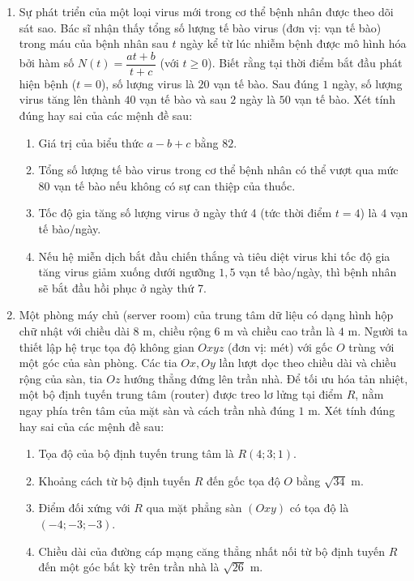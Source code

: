 \documentclass[12pt]{article}
\begin{document}
	\begin{enumerate}[label=\textbf{Câu \arabic*.}, leftmargin=*]
		
		\item Sự phát triển của một loại virus mới trong cơ thể bệnh nhân được theo dõi sát sao. Bác sĩ nhận thấy tổng số lượng tế bào virus (đơn vị: vạn tế bào) trong máu của bệnh nhân sau $t$ ngày kể từ lúc nhiễm bệnh được mô hình hóa bởi hàm số $N(t) = \dfrac{at + b}{t + c}$ (với $t \ge 0$). Biết rằng tại thời điểm bắt đầu phát hiện bệnh ($t=0$), số lượng virus là $20$ vạn tế bào. Sau đúng $1$ ngày, số lượng virus tăng lên thành $40$ vạn tế bào và sau $2$ ngày là $50$ vạn tế bào. 
		Xét tính đúng hay sai của các mệnh đề sau:
		\begin{enumerate}[label=\alph*)]
			\item Giá trị của biểu thức $a - b + c$ bằng $82$.
			\item Tổng số lượng tế bào virus trong cơ thể bệnh nhân có thể vượt qua mức $80$ vạn tế bào nếu không có sự can thiệp của thuốc.
			\item Tốc độ gia tăng số lượng virus ở ngày thứ 4 (tức thời điểm $t=4$) là $4$ vạn tế bào/ngày.
			\item Nếu hệ miễn dịch bắt đầu chiến thắng và tiêu diệt virus khi tốc độ gia tăng virus giảm xuống dưới ngưỡng $1,5$ vạn tế bào/ngày, thì bệnh nhân sẽ bắt đầu hồi phục ở ngày thứ 7.
		\end{enumerate}
		
		\vspace{4mm}
		\item Một phòng máy chủ (server room) của trung tâm dữ liệu có dạng hình hộp chữ nhật với chiều dài $8$ m, chiều rộng $6$ m và chiều cao trần là $4$ m. Người ta thiết lập hệ trục tọa độ không gian $Oxyz$ (đơn vị: mét) với gốc $O$ trùng với một góc của sàn phòng. Các tia $Ox, Oy$ lần lượt dọc theo chiều dài và chiều rộng của sàn, tia $Oz$ hướng thẳng đứng lên trần nhà. Để tối ưu hóa tản nhiệt, một bộ định tuyến trung tâm (router) được treo lơ lửng tại điểm $R$, nằm ngay phía trên tâm của mặt sàn và cách trần nhà đúng $1$ m. 
		Xét tính đúng hay sai của các mệnh đề sau:
		\begin{enumerate}[label=\alph*)]
			\item Tọa độ của bộ định tuyến trung tâm là $R(4; 3; 1)$.
			\item Khoảng cách từ bộ định tuyến $R$ đến gốc tọa độ $O$ bằng $\sqrt{34}$ m.
			\item Điểm đối xứng với $R$ qua mặt phẳng sàn $(Oxy)$ có tọa độ là $(-4; -3; -3)$.
			\item Chiều dài của đường cáp mạng căng thẳng nhất nối từ bộ định tuyến $R$ đến một góc bất kỳ trên trần nhà là $\sqrt{26}$ m.
		\end{enumerate}
		
	\end{enumerate}
	
\end{document}
